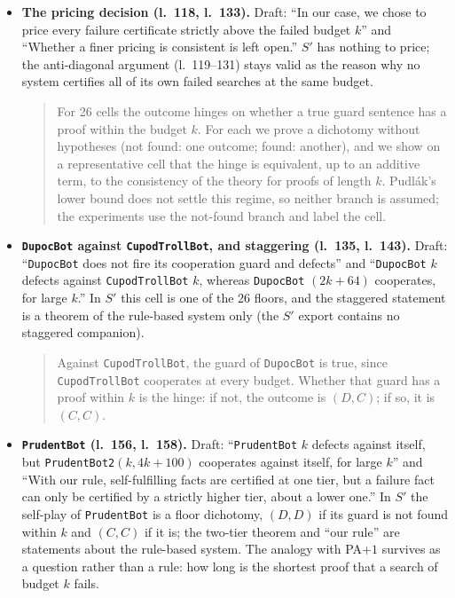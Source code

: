 \begin{itemize}
\begin{quote}
In $S'$, \texttt{DIMCID} defects against every closed program: its guard, an implication whose antecedent is its own cooperation, is self-fulfilling, and the bounded L\"ob theorem makes it provable within the budget for all sufficiently large $k$.
\end{quote}
\item \textbf{The pricing decision (l.~118, l.~133).} Draft: ``In our case, we chose to price every failure certificate strictly above the failed budget $k$'' and ``Whether a finer pricing is consistent is left open.'' $S'$ has nothing to price; the anti-diagonal argument (l.~119--131) stays valid as the reason why no system certifies all of its own failed searches at the same budget.
\begin{quote}
For 26 cells the outcome hinges on whether a true guard sentence has a proof within the budget $k$. For each we prove a dichotomy without hypotheses (not found: one outcome; found: another), and we show on a representative cell that the hinge is equivalent, up to an additive term, to the consistency of the theory for proofs of length $k$. Pudl\'ak's lower bound does not settle this regime, so neither branch is assumed; the experiments use the not-found branch and label the cell.
\end{quote}
\item \textbf{\texttt{DupocBot} against \texttt{CupodTrollBot}, and staggering (l.~135, l.~143).} Draft: ``\texttt{DupocBot} does not fire its cooperation guard and defects'' and ``\texttt{DupocBot} $k$ defects against \texttt{CupodTrollBot} $k$, whereas \texttt{DupocBot} $(2k {+} 64)$ cooperates, for large $k$.'' In $S'$ this cell is one of the 26 floors, and the staggered statement is a theorem of the rule-based system only (the $S'$ export contains no staggered companion).
\begin{quote}
Against \texttt{CupodTrollBot}, the guard of \texttt{DupocBot} is true, since \texttt{CupodTrollBot} cooperates at every budget. Whether that guard has a proof within $k$ is the hinge: if not, the outcome is $(D,C)$; if so, it is $(C,C)$.
\end{quote}
\item \textbf{\texttt{PrudentBot} (l.~156, l.~158).} Draft: ``\texttt{PrudentBot} $k$ defects against itself, but \texttt{PrudentBot2}$(k,4k{+}100)$ cooperates against itself, for large $k$'' and ``With our rule, self-fulfilling facts are certified at one tier, but a failure fact can only be certified by a strictly higher tier, about a lower one.'' In $S'$ the self-play of \texttt{PrudentBot} is a floor dichotomy, $(D,D)$ if its guard is not found within $k$ and $(C,C)$ if it is; the two-tier theorem and ``our rule'' are statements about the rule-based system. The analogy with PA${+}1$ survives as a question rather than a rule: how long is the shortest proof that a search of budget $k$ fails.

\end{itemize}
